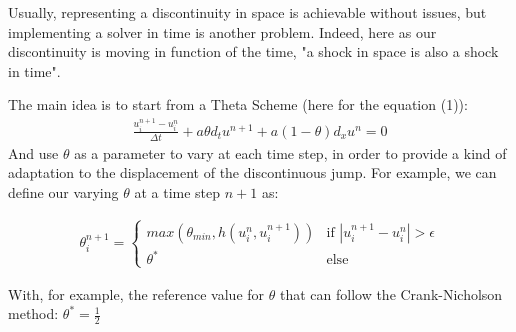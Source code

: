 \documentclass[12pt]{article}
\begin{document}
Usually, representing a discontinuity in space is achievable without issues, but implementing a solver in time is another problem.
Indeed, here as our discontinuity is moving in function of the time, "a shock in space is also a shock in time".\\
\vspace{10pt}

The main idea is to start from a Theta Scheme (here for the equation (1)):
\begin{align*}
    \frac{u_i^{n+1} - u_i^n}{\Delta t} + a\theta d_t u^{n+1} + a(1-\theta) d_x u^n = 0 \tag{2}
\end{align*}
And use $\theta$ as a parameter to vary at each time step, in order to provide a kind of adaptation to the displacement of the discontinuous jump.
For example, we can define our varying $\theta$ at a time step $n+1$ as:

\begin{align*}
    \theta_i^{n+1} = \begin{cases}
        max(\theta_{min}, h(u_i^n, u_i^{n+1})) & \text{if } |u_i^{n+1} - u_i^n| > \epsilon \\
        \theta^* & \text{else} 
    \end{cases}
\end{align*}

With, for example, the reference value for $\theta$ that can follow the Crank-Nicholson method: $\theta^* = \frac{1}{2}$




\end{document}
